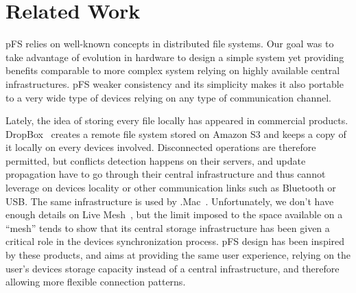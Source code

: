 
\section{Related Work}


pFS relies on well-known concepts in distributed file systems. Our
goal was to take advantage of evolution in hardware to design a simple
system yet providing benefits comparable to more complex system
relying on highly available central infrastructures. pFS weaker
consistency and its simplicity makes it also portable to a very wide
type of devices relying on any type of communication channel.

Lately, the idea of storing every file locally has appeared in
commercial products. DropBox~\cite{houston:dropbox} creates a remote
file system stored on Amazon S3 and keeps a copy of it locally on
every devices involved. Disconnected operations are therefore
permitted, but conflicts detection happens on their servers, and
update propagation have to go through their central infrastructure and
thus cannot leverage on devices locality or other communication links
such as Bluetooth or USB. The same infrastructure is used by
.Mac~\cite{apple:mac}. Unfortunately, we don't have enough details on
Live Mesh~\cite{microsoft:livemesh}, but the limit imposed to the space
available on a ``mesh'' tends to show that its central storage
infrastructure has been given a critical role in the devices
synchronization process. pFS design has been inspired by these
products, and aims at providing the same user experience, relying on
the user's devices storage capacity instead of a central
infrastructure, and therefore allowing more flexible connection
patterns.


